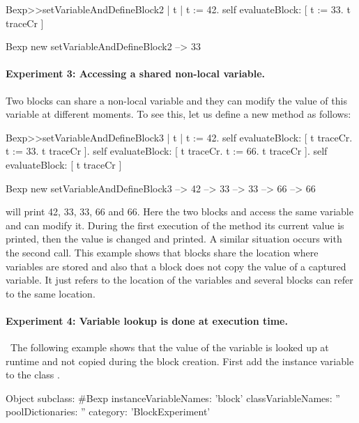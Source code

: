 \documentclass[a4paper,10pt,twoside]{book}
\begin{document}
\begin{code}{}
Bexp>>setVariableAndDefineBlock2
	| t |
	t := 42.
	self evaluateBlock: [ t := 33. t traceCr ]

Bexp new setVariableAndDefineBlock2	
	--> 33
\end{code}



\paragraph{Experiment 3: Accessing a shared non-local variable.}
Two blocks can share a non-local variable and they can modify the value of this variable at different moments. To see this, let us define a new method  as follows:

\begin{code}{}
Bexp>>setVariableAndDefineBlock3
	| t |
	t := 42.
	self evaluateBlock: [ t traceCr. t := 33. t traceCr ].
	self evaluateBlock: [ t traceCr. t := 66. t traceCr ].
	self evaluateBlock: [ t traceCr ]
\end{code}

\begin{code}{}
Bexp new setVariableAndDefineBlock3
	--> 42
	--> 33
	--> 33
	--> 66 
	--> 66
\end{code}

 will print 42, 33, 33, 66 and 66.
Here the two blocks \ct{[ t := 33. t traceCr ]} and \ct{[ t := 66. t traceCr ]} access the same variable  and can modify it. During the first execution of the method  its current value  is printed, then the value is changed and printed. A similar situation occurs with the second call. This example shows that blocks share the location where variables are stored and also that a block does not copy the value of a captured variable. It just refers to the location of the variables and several blocks can refer to the same location.

\paragraph{Experiment 4: Variable lookup is done at execution time.}\
The following example shows that the value of the variable is looked up at runtime and not copied during the block creation. First add the instance variable  to the class .

\begin{code}{}
Object subclass: #Bexp
	instanceVariableNames: 'block'
	classVariableNames: ''
	poolDictionaries: ''
	category: 'BlockExperiment'
\end{code}
\end{document}
